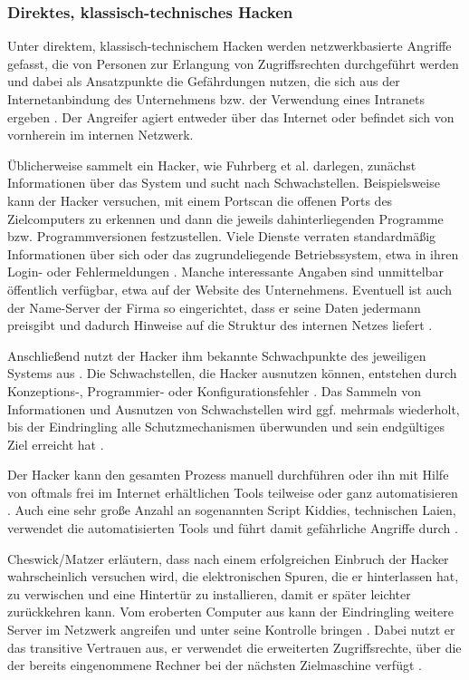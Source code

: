 \subsubsection{Direktes, klassisch-technisches Hacken}

Unter direktem, klassisch-technischem Hacken werden \va{} netzwerkbasierte
Angriffe gefasst, die von Personen zur Erlangung von Zugriffsrechten
durchgeführt werden und dabei als Ansatzpunkte die Gefährdungen nutzen, die sich
aus der Internetanbindung des Unternehmens bzw. der Verwendung eines Intranets
ergeben \cite[S. 363]{Sta01}. Der Angreifer agiert entweder über das Internet
oder befindet sich von vornherein im internen Netzwerk.

Üblicherweise sammelt ein Hacker, wie Fuhrberg et al. darlegen, zunächst
Informationen über das System und sucht nach Schwachstellen. Beispielsweise kann
der Hacker versuchen, mit einem Portscan die offenen Ports des Zielcomputers zu
erkennen und dann die jeweils dahinterliegenden Programme bzw. Programmversionen
festzustellen. Viele Dienste verraten standardmäßig Informationen über sich oder
das zugrundeliegende Betriebssystem, etwa in ihren Login- oder Fehlermeldungen
\cite[S.~58-59]{FHW01}. Manche interessante Angaben sind unmittelbar öffentlich
verfügbar, etwa auf der Website des Unternehmens. Eventuell ist auch der
Name-Server der Firma so eingerichtet, dass er seine Daten jedermann preisgibt
und dadurch Hinweise auf die Struktur des internen Netzes liefert
\cite[S.~222]{Pip00}.

Anschließend nutzt der Hacker ihm bekannte Schwachpunkte des jeweiligen Systems
aus \cite[S.~97]{Poh01}. Die Schwachstellen, die Hacker ausnutzen können,
entstehen durch Konzeptions-, Programmier- oder Konfigurationsfehler
\cite[S. 48]{FHW01}. Das Sammeln von Informationen und Ausnutzen von
Schwachstellen wird ggf. mehrmals wiederholt, bis der Eindringling alle
Schutzmechanismen überwunden und sein endgültiges Ziel erreicht hat
\cite[S.~98--99]{Rae01}.

Der Hacker kann den gesamten Prozess manuell durchführen oder ihn mit Hilfe von
oftmals frei im Internet erhältlichen Tools teilweise oder ganz automatisieren
\cite[S. 52-53]{SSF02}. Auch eine sehr große Anzahl an sogenannten \glqq{}Script
Kiddies\grqq{}, technischen Laien, verwendet die automatisierten Tools und führt
damit gefährliche Angriffe durch \cite[S.~82]{CoM99}.

Cheswick/Matzer erläutern, dass nach einem erfolgreichen Einbruch der Hacker
wahrscheinlich versuchen wird, die elektronischen Spuren, die er hinterlassen
hat, zu verwischen und eine Hintertür zu installieren, damit er später leichter
zurückkehren kann. Vom eroberten Computer aus kann der Eindringling weitere
Server im Netzwerk angreifen und unter seine Kontrolle bringen
\cite[S.~182]{ChB99}.  Dabei nutzt er das transitive Vertrauen aus, \dH{} er
verwendet die erweiterten Zugriffsrechte, über die der bereits eingenommene
Rechner bei der nächsten Zielmaschine verfügt \cite[S.~14]{KSG98}.

